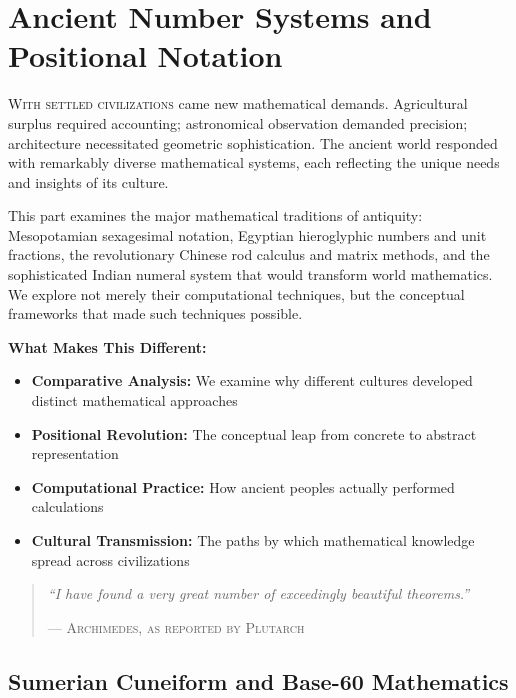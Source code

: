 \part{Ancient Number Systems and Positional Notation}
\label{part:ancient-systems}

\begin{partintro}
\lettrine[lines=3]{W}{ith settled civilizations} came new mathematical demands. Agricultural surplus required accounting; astronomical observation demanded precision; architecture necessitated geometric sophistication. The ancient world responded with remarkably diverse mathematical systems, each reflecting the unique needs and insights of its culture.

This part examines the major mathematical traditions of antiquity: Mesopotamian sexagesimal notation, Egyptian hieroglyphic numbers and unit fractions, the revolutionary Chinese rod calculus and matrix methods, and the sophisticated Indian numeral system that would transform world mathematics. We explore not merely their computational techniques, but the conceptual frameworks that made such techniques possible.

\vspace{1em}
\textbf{What Makes This Different:}
\begin{itemize}[noitemsep]
    \item \textbf{Comparative Analysis:} We examine why different cultures developed distinct mathematical approaches
    \item \textbf{Positional Revolution:} The conceptual leap from concrete to abstract representation
    \item \textbf{Computational Practice:} How ancient peoples actually performed calculations
    \item \textbf{Cultural Transmission:} The paths by which mathematical knowledge spread across civilizations
\end{itemize}

\begin{quote}
\textit{``I have found a very great number of exceedingly beautiful theorems.''}

\hfill--- \textsc{Archimedes, as reported by Plutarch}
\end{quote}
\end{partintro}

\chapter{Sumerian Cuneiform and Base-60 Mathematics  }
